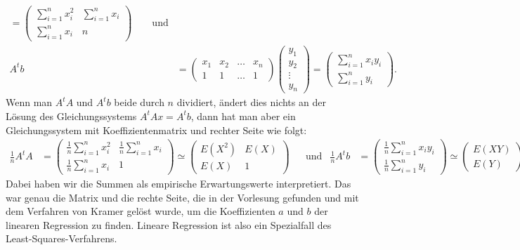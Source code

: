 \begin{loesung}
\[\begin{aligned}
=
\begin{pmatrix}
\displaystyle \sum_{i=1}^nx_i^2& \displaystyle \sum_{i=1}^nx_i\\
\displaystyle \sum_{i=1}^nx_i  & n
\end{pmatrix}
\qquad\text{und}
\\
A^tb
&=\begin{pmatrix}
x_1&x_2&\dots&x_n\\
  1&  1&\dots&1
\end{pmatrix}
\begin{pmatrix}
y_1\\
y_2\\
\vdots\\
y_n
\end{pmatrix}
=\begin{pmatrix}
\displaystyle \sum_{i=1}^n x_iy_i\\
\displaystyle \sum_{i=1}^n y_i
\end{pmatrix}.
\end{aligned}
\]
Wenn man $A^tA$ und $A^tb$ beide durch $n$ dividiert, ändert dies nichts an
der Lösung des Gleichungssystems $A^tAx=A^tb$, dann hat man aber ein
Gleichungssystem mit Koeffizientenmatrix und rechter Seite wie folgt:
\begin{align*}
\frac1nA^tA&=\begin{pmatrix}
\displaystyle \frac1n\sum_{i=1}^nx_i^2& \displaystyle \frac1n\sum_{i=1}^nx_i\\
\displaystyle \frac1n\sum_{i=1}^nx_i  & 1
\end{pmatrix}
\simeq
\begin{pmatrix}
E(X^2)&E(X)\\E(X)&1
\end{pmatrix}
&&\text{und}
&
\frac1nA^tb&=\begin{pmatrix}
\displaystyle \frac1n\sum_{i=1}^n x_iy_i\\
\displaystyle \frac1n\sum_{i=1}^n y_i
\end{pmatrix}
\simeq
\begin{pmatrix}
E(XY)\\E(Y)
\end{pmatrix}
\end{align*}
Dabei haben wir die Summen als empirische Erwartungswerte interpretiert.
Das war genau die Matrix und die rechte Seite, die in der Vorlesung gefunden
und mit dem Verfahren von Kramer gelöst wurde, um die Koeffizienten $a$ und $b$
der linearen Regression zu finden.
Lineare Regression ist also ein Spezialfall des Least-Squares-Verfahrens.
\end{loesung}
